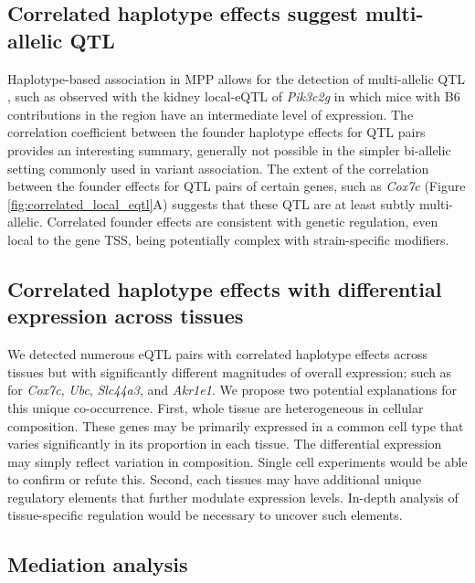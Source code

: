 \documentclass[9pt,twocolumn,twoside]{gsajnl}
\begin{document}
\subsection{Correlated haplotype effects suggest multi-allelic QTL}

Haplotype-based association in MPP allows for the detection of multi-allelic QTL \citep{Crowley2015}, such as observed with the kidney local-eQTL of \textit{Pik3c2g} in which mice with B6 contributions in the region have an intermediate level of expression. The correlation coefficient between the founder haplotype effects for QTL pairs provides an interesting summary, generally not possible in the simpler bi-allelic setting commonly used in variant association. The extent of the correlation between the founder effects for QTL pairs of certain genes, such as \textit{Cox7c} (Figure \ref{fig:correlated_local_eqtl}A) suggests that these QTL are at least subtly multi-allelic. Correlated founder effects are consistent with genetic regulation, even local to the gene TSS, being potentially complex with strain-specific modifiers.

\subsection{Correlated haplotype effects with differential expression across tissues}

We detected numerous eQTL pairs with correlated haplotype effects across tissues but with significantly different magnitudes of overall expression; such as for \textit{Cox7c}, \textit{Ubc}, \textit{Slc44a3}, and \textit{Akr1e1}. We propose two potential explanations for this unique co-occurrence. 
%
First, whole tissue are heterogeneous in cellular composition. These genes may be primarily expressed in a common cell type that varies significantly in its proportion in each tissue. The differential expression may simply reflect variation in composition. Single cell experiments would be able to confirm or refute this. 
%
Second, each tissues may have additional unique regulatory elements that further modulate expression levels. In-depth analysis of tissue-specific regulation would be necessary to uncover such elements. 

\subsection{Mediation analysis}
\end{document}
